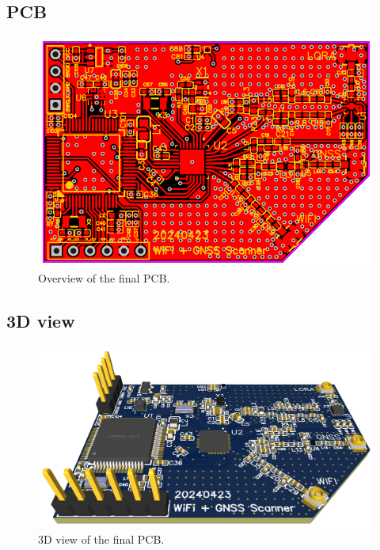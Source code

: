 \begin{appendices}
\begin{landscape}
    \subsection{PCB} \label{app:PCB}
    \begin{figure}[H]  
        \centering
        \includegraphics[width=1.25\textwidth]{figures/PCB_v3.png}
        \caption{Overview of the final PCB.}
    \end{figure}
\end{landscape}

\begin{landscape}
    \subsection{3D view} \label{app:3DView}
    \begin{figure}[H]  
        \centering
        \includegraphics[width=1.38\textwidth]{figures/PCB_v3_3D.png}
        \caption{3D view of the final PCB.}
    \end{figure}
\end{landscape}

\end{appendices}